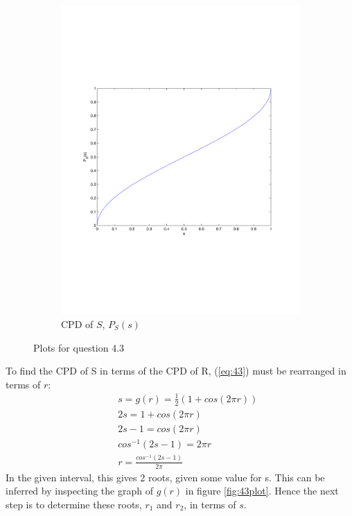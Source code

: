 \documentclass[a4paper]{article}
\begin{document}
\begin{figure}[t]
\begin{subfigure}[b]{0.4\textwidth}
            \includegraphics[width=\textwidth]{q3-cpds}
            \caption{CPD of $S$, $P_S(s)$}
            \label{fig:43cpds}
    \end{subfigure}
    \caption{Plots for question 4.3}
    \label{fig:43plots}
\end{figure}
To find the CPD of S in terms of the CPD of R, (\ref{eq:43}) must be rearranged in terms of $r$:
\begin{eqnarray}
    && s = g(r) = \frac{1}{2}(1+cos(2\pi r))\\
    && 2s = 1+cos(2\pi r)\\
    && 2s - 1 = cos(2\pi r)\\
    && cos^{-1}(2s - 1) = 2\pi r\\
    && r = \frac{cos^{-1}(2s - 1)}{2\pi}
    \label{eq:43r}
\end{eqnarray}
In the given interval, this gives 2 roots, given some value for s. This can be inferred by inspecting the graph of $g(r)$ in figure \ref{fig:43plot}. Hence the next step is to determine these roots, $r_1$ and $r_2$, in terms of $s$.
\end{document}
